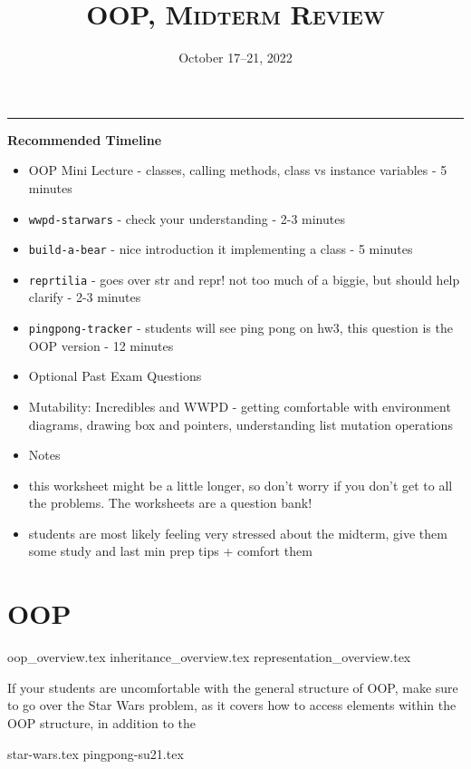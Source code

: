 \documentclass{exam}
\title{\textsc{OOP, Midterm Review}}
\date{October 17--21, 2022}
\begin{document}
	\maketitle
	\rule{\textwidth}{0.15em}
	\fontsize{12}{15}\selectfont

\begin{meta}
	\textbf{Recommended Timeline}
	\begin{itemize}
		\item OOP Mini Lecture - classes, calling methods, class vs instance variables - 5 minutes
		\item \lstinline{wwpd-starwars} - check your understanding - 2-3 minutes
		\item \lstinline{build-a-bear} - nice introduction it implementing a class - 5 minutes
		\item \lstinline{reprtilia} - goes over str and repr! not too much of a biggie, but should help clarify - 2-3 minutes
		\item \lstinline{pingpong-tracker} - students will see ping pong on hw3, this question is the OOP version - 12 minutes
		\item Optional Past Exam Questions
		\item Mutability: Incredibles and WWPD - getting comfortable with environment diagrams, drawing box and pointers, understanding list mutation operations
		\item Notes
		\item this worksheet might be a little longer, so don't worry if you don't get to all the problems. The worksheets are a question bank!
		\item students are most likely feeling very stressed about the midterm, give them some study and last min prep tips + comfort them
	\end{itemize}
\end{meta}


\section{OOP}
{oop_overview.tex}
{inheritance_overview.tex}
{representation_overview.tex}
\begin{meta}
	If your students are uncomfortable with the general structure of OOP, make sure to go over the Star Wars problem, as it covers how to access elements within the OOP structure, in addition to the 
\end{meta}
\newpage
\begin{questions}
{star-wars.tex}
\newpage
{pingpong-su21.tex}
\end{questions}
\end{document}
